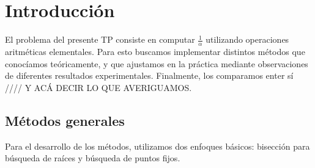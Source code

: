 \section{Introducción}
El problema del presente TP consiste en computar $\frac{1}{\alpha}$ utilizando operaciones aritméticas elementales. Para esto buscamos implementar distintos métodos que conocíamos teóricamente, y que ajustamos en la práctica mediante observaciones de diferentes resultados experimentales. Finalmente, los comparamos enter sí //// Y ACÁ DECIR LO QUE AVERIGUAMOS.

\subsection{Métodos generales}
Para el desarrollo de los métodos, utilizamos dos enfoques básicos: bisección para búsqueda de raíces y búsqueda de puntos fijos.
